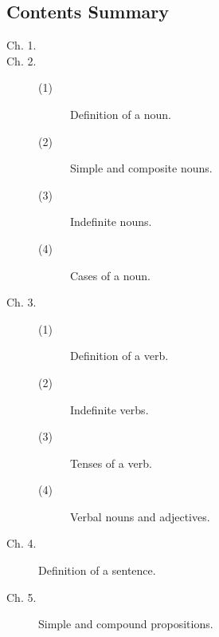 
\subsection*{Contents Summary}

\renewcommand{\aref}{\arefB}

\begin{description}
\item[Ch. 1.]

\item[Ch. 2.]
\begin{description}
 \item[(1)] Definition of a noun. 

\item[(2)] Simple and composite nouns. 

\item[(3)] Indefinite nouns. 

\item[(4)] Cases of a noun. 
\end{description}

\item[Ch. 3.]
\begin{description}
 \item[(1)] Definition of a verb. 

\item[(2)] Indefinite verbs. 

\item[(3)] Tenses of a verb. 

\item[(4)] Verbal nouns and adjectives. 
\end{description}

\item[Ch. 4.]
Definition of a sentence. 

\item[Ch. 5.]
Simple and compound propositions. 


\end{description}

